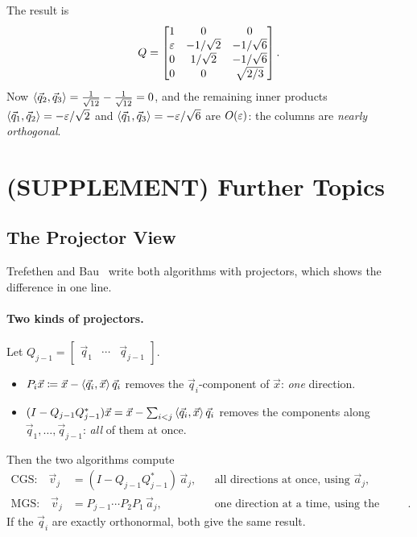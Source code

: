 \begin{example}
  The result is
  \begin{equation}
    Q = \begin{bmatrix} 1 & 0 & 0 \\ \varepsilon & -1/\sqrt{2} & -1/\sqrt{6} \\ 0 & 1/\sqrt{2} & -1/\sqrt{6} \\ 0 & 0 & \sqrt{2/3} \end{bmatrix}.
  \end{equation}
  Now $\left\langle \vec{q}_2, \vec{q}_3 \right\rangle = \frac{1}{\sqrt{12}} - \frac{1}{\sqrt{12}} = 0$, and the remaining inner products $\left\langle \vec{q}_1, \vec{q}_2 \right\rangle = -\varepsilon/\sqrt{2}$ and $\left\langle \vec{q}_1, \vec{q}_3 \right\rangle = -\varepsilon/\sqrt{6}$ are $O(\varepsilon)$: the columns are \emph{nearly orthogonal}.
\end{example}

\section{(SUPPLEMENT) Further Topics}
\label{sec:ls-further}
\subsection{The Projector View}

Trefethen and Bau~\cite[Lecture 8]{TB} write both algorithms with projectors, which shows the difference in one line.

\paragraph{Two kinds of projectors.} Let $Q_{j-1} = \begin{bmatrix} \vec{q}_1 & \cdots & \vec{q}_{j-1} \end{bmatrix}$.
\begin{itemize}
  \item $P_i\vec{x} \coloneqq \vec{x} - \left\langle \vec{q}_i, \vec{x} \right\rangle\vec{q}_i$ removes the $\vec{q}_i$-component of $\vec{x}$: \emph{one} direction.
  \item $(I - Q_{j-1}Q_{j-1}^\ast)\vec{x} = \vec{x} - \sum_{i<j}\left\langle \vec{q}_i, \vec{x} \right\rangle\vec{q}_i$ removes the components along $\vec{q}_1, \dots, \vec{q}_{j-1}$: \emph{all} of them at once.
\end{itemize}
Then the two algorithms compute
\begin{align}
  \text{CGS:}\quad \vec{v}_j &= (I - Q_{j-1}Q_{j-1}^\ast)\,\vec{a}_j, & &\text{all directions at once, using } \vec{a}_j, \\
  \text{MGS:}\quad \vec{v}_j &= P_{j-1}\cdots P_2P_1\,\vec{a}_j, & &\text{one direction at a time, using the current vector}.
\end{align}
If the $\vec{q}_i$ are exactly orthonormal, both give the same result.

